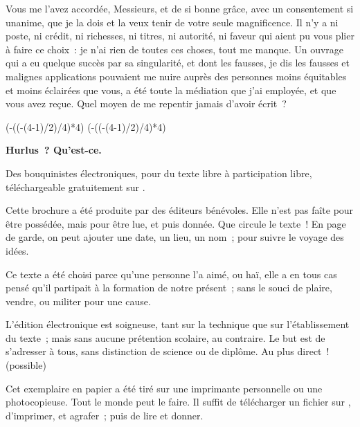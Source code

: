 \documentclass[french,twoside]{book} %
\newcommand\chapterclose{} %
\def\truncdiv#1#2{((#1-(#2-1)/2)/#2)}
\def\moduloop#1#2{(#1-\truncdiv{#1}{#2}*#2)}
\def\modulo#1#2{\number\numexpr\moduloop{#1}{#2}\relax}
\begin{document}
Vous me l’avez accordée, Messieurs, et de si bonne grâce, avec un consentement si unanime, que je la dois et la veux tenir de votre seule magnificence. Il n’y a ni poste, ni crédit, ni richesses, ni titres, ni autorité, ni faveur qui aient pu vous plier à faire ce choix : je n’ai rien de toutes ces choses, tout me manque. Un ouvrage qui a eu quelque succès par sa singularité, et dont les fausses, je dis les fausses et malignes applications pouvaient me nuire auprès des personnes moins équitables et moins éclairées que vous, a été toute la médiation que j’ai employée, et que vous avez reçue. Quel moyen de me repentir jamais d’avoir écrit ?
\chapterclose

 


\ifbooklet
  \pagestyle{empty}
  \clearpage
  \ifnum\modulo{\value{page}}{4}=0 \hbox{}\newpage\hbox{}\newpage\fi
  \ifnum\modulo{\value{page}}{4}=1 \hbox{}\newpage\hbox{}\newpage\fi


  \hbox{}\newpage
  \ifodd\value{page}\hbox{}\newpage\fi
  {\centering\color{rubric}\bfseries\noindent\large
    Hurlus ? Qu’est-ce.\par
    \bigskip
  }
  \noindent Des bouquinistes électroniques, pour du texte libre à participation libre,
  téléchargeable gratuitement sur \href{https://hurlus.fr}{}.\par
  \bigskip
  \noindent Cette brochure a été produite par des éditeurs bénévoles.
  Elle n’est pas faîte pour être possédée, mais pour être lue, et puis donnée.
  Que circule le texte !
  En page de garde, on peut ajouter une date, un lieu, un nom ; pour suivre le voyage des idées.
  \par

  Ce texte a été choisi parce qu’une personne l’a aimé,
  ou haï, elle a en tous cas pensé qu’il partipait à la formation de notre présent ;
  sans le souci de plaire, vendre, ou militer pour une cause.
  \par

  L’édition électronique est soigneuse, tant sur la technique
  que sur l’établissement du texte ; mais sans aucune prétention scolaire, au contraire.
  Le but est de s’adresser à tous, sans distinction de science ou de diplôme.
  Au plus direct ! (possible)
  \par

  Cet exemplaire en papier a été tiré sur une imprimante personnelle
   ou une photocopieuse. Tout le monde peut le faire.
  Il suffit de
  télécharger un fichier sur \href{https://hurlus.fr}{},
  d’imprimer, et agrafer ; puis de lire et donner.\par
\end{document}
